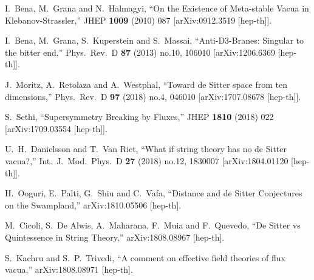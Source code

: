 \documentclass[11pt,a4paper]{article}
\begin{document}
\begin{thebibliography}{99}
  I.~Bena, M.~Grana and N.~Halmagyi,
  ``On the Existence of Meta-stable Vacua in Klebanov-Strassler,''
  JHEP {\bf 1009} (2010) 087
  [arXiv:0912.3519 [hep-th]].


  I.~Bena, M.~Grana, S.~Kuperstein and S.~Massai,
  ``Anti-D3-Branes: Singular to the bitter end,''
  Phys.\ Rev.\ D {\bf 87} (2013) no.10,  106010
  [arXiv:1206.6369 [hep-th]].


  J.~Moritz, A.~Retolaza and A.~Westphal,
  ``Toward de Sitter space from ten dimensions,''
  Phys.\ Rev.\ D {\bf 97} (2018) no.4,  046010
  [arXiv:1707.08678 [hep-th]].


  S.~Sethi,
  ``Supersymmetry Breaking by Fluxes,''
  JHEP {\bf 1810} (2018) 022
  [arXiv:1709.03554 [hep-th]].


  U.~H.~Danielsson and T.~Van Riet,
  ``What if string theory has no de Sitter vacua?,''
  Int.\ J.\ Mod.\ Phys.\ D {\bf 27} (2018) no.12,  1830007
  [arXiv:1804.01120 [hep-th]].


  H.~Ooguri, E.~Palti, G.~Shiu and C.~Vafa,
  ``Distance and de Sitter Conjectures on the Swampland,''
  arXiv:1810.05506 [hep-th].


  M.~Cicoli, S.~De Alwis, A.~Maharana, F.~Muia and F.~Quevedo,
  ``De Sitter vs Quintessence in String Theory,''
  arXiv:1808.08967 [hep-th].


  S.~Kachru and S.~P.~Trivedi,
  ``A comment on effective field theories of flux vacua,''
  arXiv:1808.08971 [hep-th].



\end{thebibliography}
\end{document}
